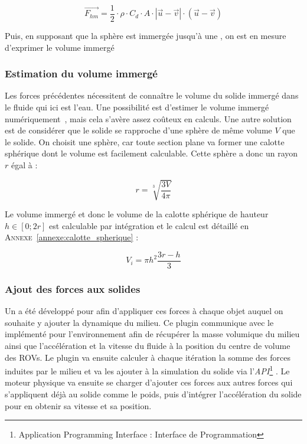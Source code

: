 				\begin{equation}
					\overrightarrow{F_{hm}} = \frac{1}{2} \cdot \rho \cdot C_d \cdot A \cdot |\overrightarrow{u} - \overrightarrow{v}| \cdot (\overrightarrow{u} - \overrightarrow{v})
				\end{equation}

				Puis, en supposant que la sphère est immergée jusqu'à une , on est en mesure d'exprimer le volume immergé 

			\subsubsection{Estimation du volume immergé}

				Les forces précédentes nécessitent de connaître le volume du solide immergé dans le fluide qui ici est l'eau. Une possibilité est d'estimer le volume immergé numériquement~\cite{gilloteaux:tel-00521689}, mais cela s'avère assez coûteux en calculs. Une autre solution est de considérer que le solide se rapproche d'une sphère de même volume $V$ que le solide. On choisit une sphère, car toute section plane va former une calotte sphérique dont le volume est facilement calculable. Cette sphère a donc un rayon $r$ égal à :

				\begin{equation}
					r = \sqrt[3]{\frac{3 V}{4 \pi}}
				\end{equation}

				Le volume immergé et donc le volume de la calotte sphérique de hauteur $h \in [0; 2r]$ est calculable par intégration et le calcul est détaillé en \textsc{Annexe}~\ref{annexe:calotte_spherique} :

				\begin{equation}
					V_i = \pi h^2\frac{3r-h}{3} \label{eqn:v_immerge}
				\end{equation}


			\subsubsection{Ajout des forces aux solides}

				Un \plugin{} a été développé pour \gazebo{} afin d'appliquer ces forces à chaque objet auquel on souhaite y ajouter la dynamique du milieu. Ce plugin communique avec le \plugin{} implémenté pour l'environnement afin de récupérer la masse volumique du milieu ainsi que l'accélération et la vitesse du fluide à la position du centre de volume des \gls{ROV}s. Le plugin va ensuite calculer à chaque itération la somme des forces induites par le milieu et va les ajouter à la simulation du solide via l'\textit{API}\footnote{Application Programming Interface : Interface de Programmation} \gazebo{}. Le moteur physique va ensuite se charger d'ajouter ces forces aux autres forces qui s'appliquent déjà au solide comme le poids, puis d'intégrer l'accélération du solide pour en obtenir sa vitesse et sa position.

